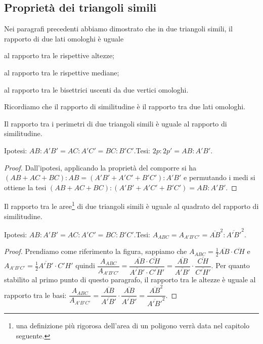 \subsection{Proprietà dei triangoli simili}

Nei paragrafi precedenti abbiamo dimostrato che in due triangoli simili, il rapporto di due lati omologhi è uguale
\begin{itemize*}
\item al rapporto tra le rispettive altezze;
\item al rapporto tra le rispettive mediane;
\item al rapporto tra le bisettrici uscenti da due vertici omologhi.
\end{itemize*}

Ricordiamo che il rapporto di similitudine è il rapporto tra due lati omologhi.

\begin{teorema}\label{teo:6.3}%
Il rapporto tra i perimetri di due triangoli simili è uguale al rapporto di similitudine.
\end{teorema}

\noindent Ipotesi: $AB:A'B'=AC:A'C'=BC:B'C'$.\tab Tesi: $2p : 2p' = AB : A'B'$.

\begin{proof}
Dall'ipotesi, applicando la proprietà del comporre si ha $(AB+AC+BC):AB=(A'B'+A'C'+B'C'):A'B'$ e permutando i medi si ottiene la tesi $(AB+AC+BC):(A'B'+A'C'+B'C')=AB:A'B'$.
\end{proof}

\begin{teorema}\label{teo:6.4}%
Il rapporto tra le aree\footnote{una definizione più rigorosa dell'area di un poligono verrà data nel capitolo seguente.} di due triangoli simili è uguale al quadrato del rapporto di similitudine.
\end{teorema}

\noindent Ipotesi: $AB:A'B'=AC:A'C'=BC:B'C'$.\tab Tesi: $A_{ABC}=A_{A'B'C'}=\overline{AB}^2:\overline{A'B'}^2$.

\begin{proof}
Prendiamo come riferimento la figura, sappiamo che 
$A_{ABC}=\frac{1}{2}\overline{AB}\cdot\overline{CH}$ e $A_{A'B'C'}=\frac{1}{2}\overline{A'B'}\cdot{C'H'}$ quindi $\dfrac{A_{ABC}}{A_{A'B'C'}} = \dfrac{\overline{AB}\cdot\overline{CH}}{\overline{A'B'}\cdot\overline{C'H'}} = \dfrac{\overline{AB}}{\overline{A'B'}}\cdot \dfrac{\overline{CH}}{\overline{C'H'}}$.
Per quanto stabilito al primo punto di questo paragrafo, il rapporto tra le altezze è uguale al rapporto tra le basi: 
$\dfrac{A_{ABC}}{A_{A'B'C'}} = \dfrac{\overline{AB}}{\overline{A'B'}}\cdot \dfrac{\overline{AB}}{\overline{A'B'}} = \dfrac{\overline{AB}^2}{\overline{A'B'}^2}$.
\end{proof}


